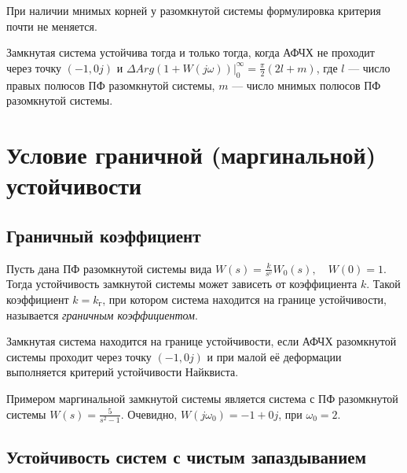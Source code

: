 \documentclass[../../TAU.tex]{subfiles}
\begin{document}
    При наличии мнимых корней у разомкнутой системы формулировка критерия почти не меняется.

    \theor[Найквист]
    Замкнутая система устойчива тогда и только тогда, когда АФЧХ не проходит через точку $(-1,0j)$ и $\left.\Delta Arg(1+W(j\omega))\right|^{\infty}_0 = \frac{\pi}{2}(2l+m)$, где $l$ --- число правых полюсов ПФ разомкнутой системы, $m$ --- число мнимых полюсов ПФ разомкнутой системы.

\section{Условие граничной (маргинальной) устойчивости}


\subsection{Граничный коэффициент}

    Пусть дана ПФ разомкнутой системы вида 
    $W(s) =  \frac{k}{s^v}W_0(s), \quad W(0) = 1$. 
    Тогда устойчивость замкнутой системы может зависеть от коэффициента $k$. Такой коэффициент $k=k_\text{г}$, при котором система находится на границе устойчивости, называется {\it граничным коэффициентом}.

    \begin{theor}
        Замкнутая система находится на границе устойчивости, если АФЧХ разомкнутой системы проходит через точку $(-1,0j)$ и при малой её деформации выполняется  критерий устойчивости Найквиста.
    \end{theor}
    Примером маргинальной замкнутой системы является система с ПФ разомкнутой системы $W(s) = \frac{5}{s^2-1}$. Очевидно, $W(j\omega_0) = -1+0j$, при $\omega_0 = 2$.

\subsection{Устойчивость систем с чистым запаздыванием}
\end{document}
